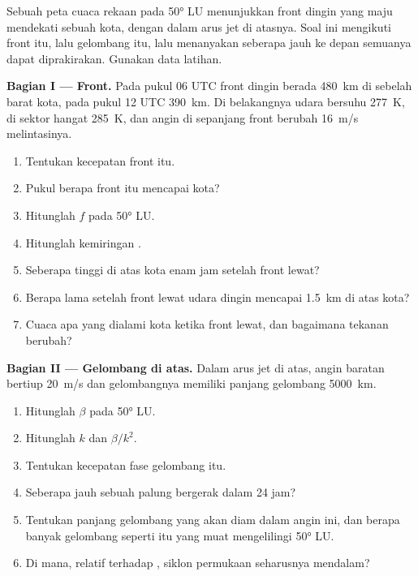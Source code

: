 \begin{problem}\label{pb:b2:weather-systems:1}
Sebuah peta cuaca rekaan pada \ang{50} LU menunjukkan front dingin yang maju mendekati sebuah kota, dengan 
dalam arus jet di atasnya. Soal ini mengikuti front itu, lalu gelombang itu, lalu menanyakan seberapa jauh
ke depan semuanya dapat diprakirakan. Gunakan data latihan.

\medskip\noindent\textbf{Bagian I --- Front.}
Pada pukul 06 UTC front dingin berada \qty{480}{km} di sebelah barat kota, pada pukul 12 UTC \qty{390}{km}. Di belakangnya
udara bersuhu \qty{277}{K}, di sektor hangat \qty{285}{K}, dan angin di sepanjang front
berubah \qty{16}{m/s} melintasinya.
\begin{enumerate}
  \item Tentukan kecepatan front itu.
  \item Pukul berapa front itu mencapai kota?
  \item Hitunglah $f$ pada \ang{50} LU.
  \item Hitunglah kemiringan .
  \item Seberapa tinggi  di atas kota enam jam setelah front lewat?
  \item Berapa lama setelah front lewat udara dingin mencapai \qty{1.5}{km} di atas kota?
  \item Cuaca apa yang dialami kota ketika front lewat, dan bagaimana tekanan berubah?
\end{enumerate}

\medskip\noindent\textbf{Bagian II --- Gelombang di atas.}
Dalam arus jet di atas, angin baratan bertiup \qty{20}{m/s} dan gelombangnya memiliki panjang gelombang \qty{5000}{km}.
\begin{enumerate}[resume]
  \item Hitunglah $\beta$ pada \ang{50} LU.
  \item Hitunglah $k$ dan $\beta/k^2$.
  \item Tentukan kecepatan fase gelombang itu.
  \item Seberapa jauh sebuah palung bergerak dalam 24 jam?
  \item Tentukan panjang gelombang yang akan diam dalam angin ini, dan berapa banyak gelombang seperti itu yang muat
        mengelilingi \ang{50} LU.
  \item Di mana, relatif terhadap , siklon permukaan seharusnya mendalam?
\end{enumerate}


\end{problem}
